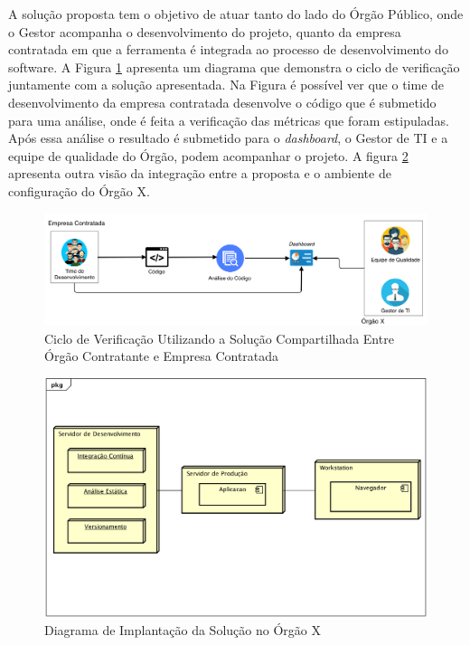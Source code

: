 A solução proposta tem o objetivo de atuar tanto do lado do Órgão Público, onde o Gestor acompanha o desenvolvimento do projeto, quanto da empresa contratada em que a ferramenta é integrada ao processo de desenvolvimento do software. A Figura \ref{img:ciclo_ver} apresenta um diagrama que demonstra o ciclo de verificação juntamente com a solução apresentada. Na Figura é possível ver que o time de desenvolvimento da empresa contratada desenvolve o código que é submetido para uma análise, onde é feita a verificação das métricas que foram estipuladas. Após essa análise o resultado é submetido para o \textit{dashboard},  o Gestor de TI e a equipe de qualidade do Órgão, podem acompanhar o projeto. A figura \ref{img:diagram_implantacao} apresenta outra visão da integração entre a proposta e o ambiente de configuração do Órgão X.

\graphicspath{{figuras/}}
\begin{figure}[!]
\centering
\includegraphics[scale=0.30]{proc_ver.png}
\caption{Ciclo de Verificação Utilizando a Solução Compartilhada Entre Órgão Contratante e Empresa Contratada}
\label{img:ciclo_ver}
\end{figure}

\graphicspath{{figuras/}}
\begin{figure}[!]
\centering
\includegraphics[scale=0.60]{diagrama_implantacao}
\caption{Diagrama de Implantação da Solução no Órgão X} 
\label{img:diagram_implantacao}
\end{figure}



